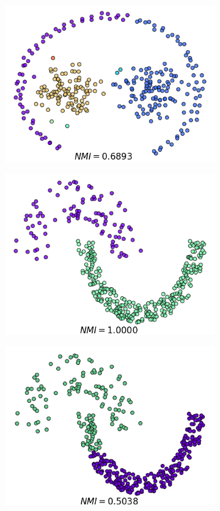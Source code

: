 \documentclass{llncs}
\begin{document}
\begin{figure}[ht]
\begin{subfigure}[t]{0.23\textwidth}
\includegraphics[width=1\textwidth]{image/pathbased_dbscan.png}
\end{subfigure}
\quad
\quad
\quad
\quad
\begin{subfigure}[t]{0.23\textwidth}
\centering
\includegraphics[width=1\textwidth]{image/jain_MDPC.png}
\end{subfigure}
\begin{subfigure}[t]{0.23\textwidth}
\centering
\includegraphics[width=1\textwidth]{image/jain_org.png}

\end{subfigure}
\end{figure}
\end{document}

